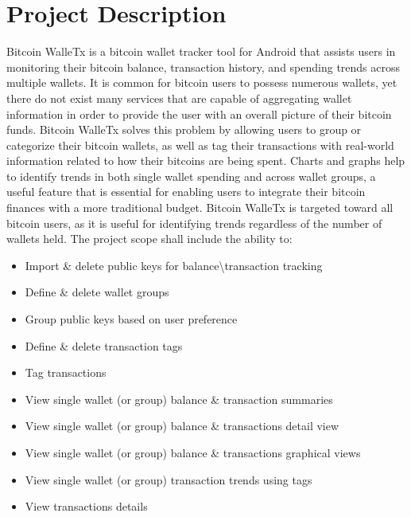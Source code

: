 \documentclass[12pt]{article}
\begin{document}
  \section{Project Description}
  \begin{adjustwidth}{1.5em}{0pt}

  \normalsize{Bitcoin WalleTx is a bitcoin wallet tracker tool for Android that assists users in monitoring their bitcoin balance, transaction history, and spending trends across multiple wallets. It is common for bitcoin users to possess numerous wallets, yet there do not exist many services that are capable of aggregating wallet information in order to provide the user with an overall picture of their bitcoin funds. Bitcoin WalleTx solves this problem by allowing users to group or categorize their bitcoin wallets, as well as tag their transactions with real-world information related to how their bitcoins are being spent. Charts and graphs help to identify trends in both single wallet spending and across wallet groups, a useful feature that is essential for enabling users to integrate their bitcoin finances with a more traditional budget. Bitcoin WalleTx is targeted toward all bitcoin users, as it is useful for identifying trends regardless of the number of wallets held. The project scope shall include the ability to:}\\ 
  \end{adjustwidth}

  \begin{adjustwidth}{1.5em}{0pt}
    \begin{itemize}
      \item Import \& delete public keys for balance\textbackslash{transaction} tracking
      \item Define \& delete wallet groups
      \item Group public keys based on user preference
      \item Define \& delete transaction tags
      \item Tag transactions
      \item View single wallet (or group) balance \& transaction summaries
      \item View single wallet (or group) balance \& transactions detail view
      \item View single wallet (or group) balance \& transactions graphical views
      \item View single wallet (or group) transaction trends using tags
      \item View transactions details

    \end{itemize}
  \end{adjustwidth}
\end{document}

